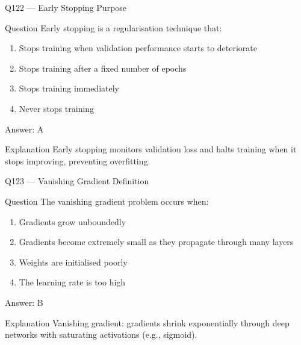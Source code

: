 \documentclass[aspectratio=169,8pt]{beamer}
\begin{document}
	\begin{frame}{Q122 --- Early Stopping Purpose}
		\begin{block}{Question}
			Early stopping is a regularisation technique that:
			\begin{enumerate}
				\item Stops training when validation performance starts to deteriorate
				\item Stops training after a fixed number of epochs
				\item Stops training immediately
				\item Never stops training
			\end{enumerate}
		\end{block}
		\begin{exampleblock}{Answer: A}\end{exampleblock}
		\begin{block}{Explanation}
			Early stopping monitors validation loss and halts training when it stops improving, preventing overfitting.
		\end{block}
	\end{frame}
	
	\begin{frame}{Q123 --- Vanishing Gradient Definition}
		\begin{block}{Question}
			The vanishing gradient problem occurs when:
			\begin{enumerate}
				\item Gradients grow unboundedly
				\item Gradients become extremely small as they propagate through many layers
				\item Weights are initialised poorly
				\item The learning rate is too high
			\end{enumerate}
		\end{block}
		\begin{exampleblock}{Answer: B}\end{exampleblock}
		\begin{block}{Explanation}
			Vanishing gradient: gradients shrink exponentially through deep networks with saturating activations (e.g., sigmoid).
		\end{block}
	\end{frame}
	
\end{document}
